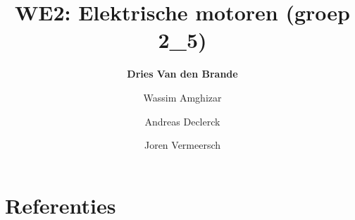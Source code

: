 \documentclass[12pt]{article}
\title{WE2: Elektrische motoren (groep 2\_5)}
\author{\textbf{Dries Van den Brande} \and Wassim Amghizar 
\and Andreas Declerck \and Joren Vermeersch}
\begin{document}
\maketitle















\section{Referenties}
\end{document}
